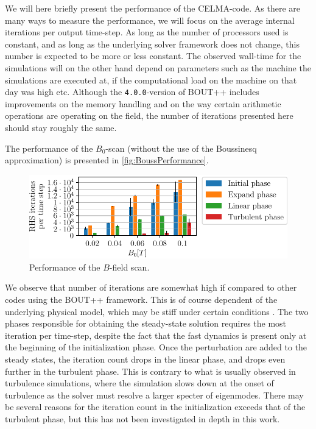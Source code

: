 %
We will here briefly present the performance of the CELMA-code.
As there are many ways to measure the performance, we will focus on the average internal iterations per output time-step.
As long as the number of processors used is constant, and as long as the underlying solver framework does not change, this number is expected to be more or less constant.
The observed wall-time for the simulations will on the other hand depend on parameters such as the machine the simulations are executed at, if the computational load on the machine on that day was high etc.
Although the \texttt{4.0.0}-version of BOUT++ includes improvements on the memory handling and on the way certain arithmetic operations are operating on the field, the number of iterations presented here should stay roughly the same.

The performance of the $B_0$-scan (without the use of the Boussinesq approximation) is presented in \cref{fig:BoussPerformance}.
%
\begin{figure}[htb]
    \centering
    \includegraphics{fig/results/performance/RHSEvalsPerTimeBScan}
    \caption{Performance of the $B$-field scan.}
    \label{fig:BPerformance}
\end{figure}
%
We observe that number of iterations are somewhat high if compared to other codes using the BOUT++ framework.
This is of course dependent of the underlying physical model, which may be stiff under certain conditions \cite{Leveque2007book}.
The two phases responsible for obtaining the steady-state solution requires the most iteration per time-step, despite the fact that the fast dynamics is present only at the beginning of the initialization phase.
Once the perturbation are added to the steady states, the iteration count drops in the linear phase, and drops even further in the turbulent phase.
This is contrary to what is usually observed in turbulence simulations, where the simulation slows down at the onset of turbulence as the solver must resolve a larger specter of eigenmodes.
There may be several reasons for the iteration count in the initialization exceeds that of the turbulent phase, but this has not been investigated in depth in this work.
